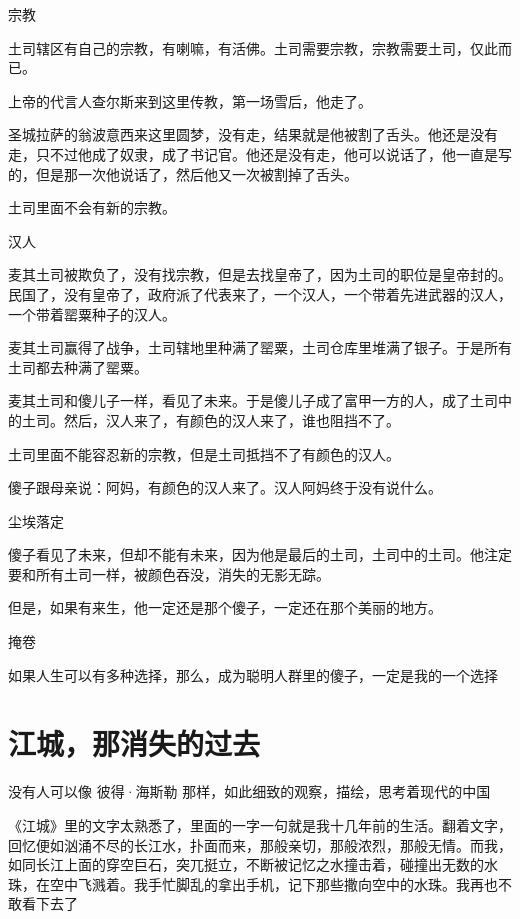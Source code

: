 宗教

土司辖区有自己的宗教，有喇嘛，有活佛。土司需要宗教，宗教需要土司，仅此而已。

上帝的代言人查尔斯来到这里传教，第一场雪后，他走了。

圣城拉萨的翁波意西来这里圆梦，没有走，结果就是他被割了舌头。他还是没有走，只不过他成了奴隶，成了书记官。他还是没有走，他可以说话了，他一直是写的，但是那一次他说话了，然后他又一次被割掉了舌头。

土司里面不会有新的宗教。

汉人

麦其土司被欺负了，没有找宗教，但是去找皇帝了，因为土司的职位是皇帝封的。民国了，没有皇帝了，政府派了代表来了，一个汉人，一个带着先进武器的汉人，一个带着罂粟种子的汉人。

麦其土司赢得了战争，土司辖地里种满了罂粟，土司仓库里堆满了银子。于是所有土司都去种满了罂粟。

麦其土司和傻儿子一样，看见了未来。于是傻儿子成了富甲一方的人，成了土司中的土司。然后，汉人来了，有颜色的汉人来了，谁也阻挡不了。

土司里面不能容忍新的宗教，但是土司抵挡不了有颜色的汉人。

傻子跟母亲说：阿妈，有颜色的汉人来了。汉人阿妈终于没有说什么。

尘埃落定

傻子看见了未来，但却不能有未来，因为他是最后的土司，土司中的土司。他注定要和所有土司一样，被颜色吞没，消失的无影无踪。

但是，如果有来生，他一定还是那个傻子，一定还在那个美丽的地方。

掩卷

如果人生可以有多种选择，那么，成为聪明人群里的傻子，一定是我的一个选择



\newpage
\section*{江城，那消失的过去}


没有人可以像 彼得·海斯勒 那样，如此细致的观察，描绘，思考着现代的中国

《江城》里的文字太熟悉了，里面的一字一句就是我十几年前的生活。翻着文字，回忆便如汹涌不尽的长江水，扑面而来，那般亲切，那般浓烈，那般无情。而我，如同长江上面的穿空巨石，突兀挺立，不断被记忆之水撞击着，碰撞出无数的水珠，在空中飞溅着。我手忙脚乱的拿出手机，记下那些撒向空中的水珠。我再也不敢看下去了


